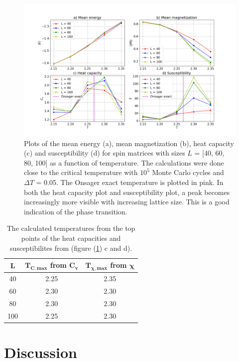 \documentclass[10pt,a4paper,titlepage]{article}
\begin{document}
\begin{figure}[]
\centering
\centering\includegraphics[scale=0.3]{e_L_40_100.png}
\caption{Plots of the mean energy (a), mean magnetization (b), heat capacity (c) and susceptibility (d) for spin matrices with sizes $L$ = [40, 60, 80, 100] as a function of temperature. The calculations were done close to the critical temperature with $10^5$ Monte Carlo cycles and $\Delta T$ = 0.05. The Onsager exact temperature is plotted in pink. In both the heat capacity plot and susceptibility plot, a peak becomes increasingly more visible with increasing lattice size. This is a good indication of the phase transition. \label{fig:phase}}
\end{figure}

\begin{table}[ht!]
\centering
\caption{The calculated temperatures from the top points of the heat capacities and susceptibilites from (figure (\ref{fig:phase}) c and d). } \label{tab:critical_temp}
\begin{tabular}{| c | c | c |} \hline
\textbf{L} & $\mathbf{T_{C, max}}$ from $\mathbf{C_v}$ & $\mathbf{T_{\chi, max}}$ from $\mathbf{\chi}$  \\ \hline
40 & 2.25 & 2.35 \\ \hline
60 & 2.30 & 2.30 \\ \hline
80 & 2.30 & 2.30 \\ \hline
100 & 2.25 & 2.30 \\ \hline
\end{tabular}
\end{table}
\section{Discussion}
\end{document}
